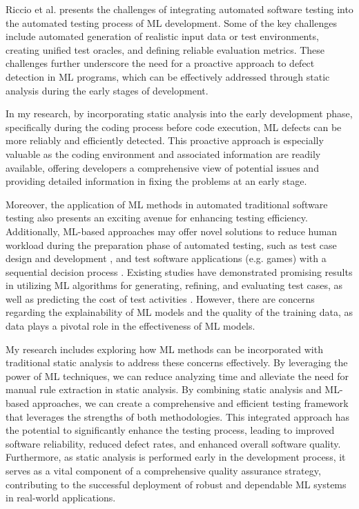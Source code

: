 \documentclass[11pt]{article}
\begin{document}
Riccio et al. \cite{riccioTestingMachineLearning2020} presents the challenges of integrating automated software testing into the automated testing process of ML development. Some of the key challenges include automated generation of realistic input data or test environments, creating unified test oracles, and defining reliable evaluation metrics. These challenges further underscore the need for a proactive approach to defect detection in ML programs, which can be effectively addressed through static analysis during the early stages of development.

In my research, by incorporating static analysis into the early development phase, specifically during the coding process before code execution, ML defects can be more reliably and efficiently detected. This proactive approach is especially valuable as the coding environment and associated information are readily available, offering developers a comprehensive view of potential issues and providing detailed information in fixing the problems at an early stage.

Moreover, the application of ML methods in automated traditional software testing also presents an exciting avenue for enhancing testing efficiency. Additionally, ML-based approaches may offer novel solutions to reduce human workload during the preparation phase of automated testing, such as test case design and development \cite{durelliMachineLearningApplied2019}, and test software applications (e.g. games) with a sequential decision process \cite{zhengWujiAutomaticOnline2019}. Existing studies have demonstrated promising results in utilizing ML algorithms for generating, refining, and evaluating test cases, as well as predicting the cost of test activities \cite{durelliMachineLearningApplied2019}. However, there are concerns regarding the explainability of ML models and the quality of the training data, as data plays a pivotal role in the effectiveness of ML models.

My research includes exploring how ML methods can be incorporated with traditional static analysis to address these concerns effectively. By leveraging the power of ML techniques, we can reduce analyzing time and alleviate the need for manual rule extraction in static analysis. By combining static analysis and ML-based approaches, we can create a comprehensive and efficient testing framework that leverages the strengths of both methodologies. This integrated approach has the potential to significantly enhance the testing process, leading to improved software reliability, reduced defect rates, and enhanced overall software quality. Furthermore, as static analysis is performed early in the development process, it serves as a vital component of a comprehensive quality assurance strategy, contributing to the successful deployment of robust and dependable ML systems in real-world applications.
\end{document}
